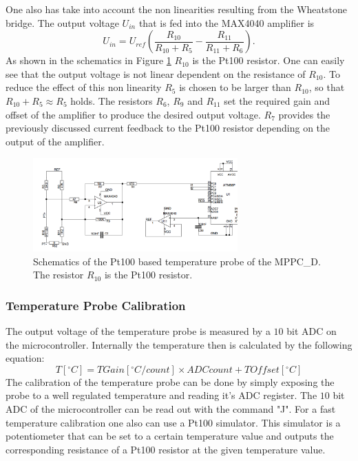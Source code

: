One also has take into account the non linearities resulting from the Wheatstone bridge. The output voltage $U_{in}$ that is fed into the MAX4040 amplifier is
	\begin{equation}
		U_{in} = U_{ref}(\frac{R_{10}}{R_{10} + R_5} - \frac{R_{11}}{R_{11} + R_6}).
	\end{equation}
As shown in the schematics in Figure \ref{pt100_probe} $R_{10}$ is the Pt100 resistor. One can easily see that the output voltage is not linear dependent on the resistance
of $R_{10}$. To reduce the effect of this non linearity $R_{5}$ is chosen to be larger than $R_{10}$, so that $R_{10} + R_{5} \approx R_{5}$ holds. The resistors $R_6$, $R_9$ and 
$R_{11}$ set the required gain and offset of the amplifier to produce the desired output voltage. 
$R_7$ provides the previously discussed current feedback to the Pt100 resistor depending on the output of the amplifier.

	\begin{figure}[t]
		\centering
			\includegraphics[width=0.7\textwidth]{Figures/weinstock/pt100_probe.png}
		\caption{Schematics of the Pt100 based temperature probe of the MPPC\_D. The resistor $R_{10}$ is the Pt100 resistor.}
		\label{pt100_probe}
	\end{figure}	
 
\subsubsection{Temperature Probe Calibration}

The output voltage of the temperature probe is measured by a $10$ bit ADC on the microcontroller. Internally the temperature then is calculated by the following equation:
\begin{equation}
	T[^{\circ}C] = TGain[^{\circ}C/count] \times ADCcount + TOffset[^{\circ}C]
\end{equation}
The calibration of the temperature probe can be done by simply exposing the probe to a well regulated temperature and reading it's ADC register. The $10$ bit ADC of the microcontroller
can be read out with the command "J". For a fast temperature calibration one also can use a Pt100 simulator. This simulator is a potentiometer that can be set to a certain 
temperature value and outputs the corresponding resistance of a Pt100 resistor at the given temperature value. 

